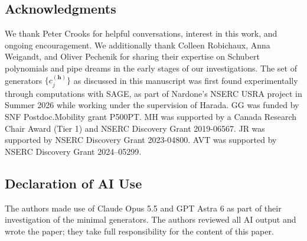 \documentclass[11pt]{amsart}
\theoremstyle{plain}
\theoremstyle{definition}
\newcommand{\hess}{{\mathbf h}}
\numberwithin{equation}{section}
\begin{document}
\subsection*{Acknowledgments}
We thank Peter Crooks for helpful conversations, interest in this work, and ongoing encouragement. We additionally thank Colleen Robichaux, Anna Weigandt, and Oliver Pechenik for sharing their expertise on Schubert polynomials and pipe dreams in the early stages of our investigations. The set of generators $\{c_j^{(\hess)}\}$ as discussed in this manuscript was first found experimentally through computations with SAGE, as part of Nardone's NSERC USRA project in Summer 2026 while working under the 
supervision of Harada.  
GG was funded by SNF Postdoc.Mobility grant P500PT.
MH was supported by a Canada Research Chair Award (Tier 1) and NSERC Discovery Grant 2019-06567. 
JR was supported by NSERC Discovery Grant 2023-04800. 
AVT was supported by NSERC Discovery Grant 2024--05299. 

\subsection*{Declaration of AI Use}  
The authors made use of Claude Opus 5.5 and GPT Astra 6 as
part of their investigation of the minimal generators.  
The authors reviewed  all AI output and  wrote
the paper; they take full 
responsibility for the content of this paper.





\end{document}
